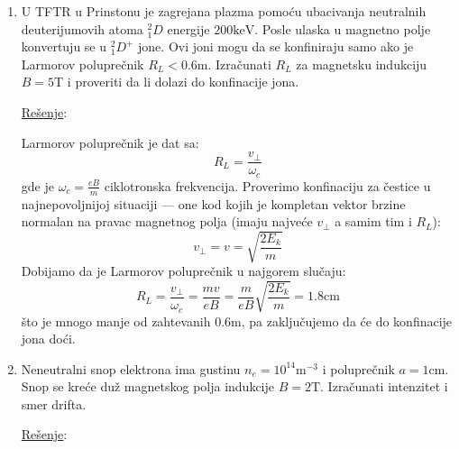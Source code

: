 \documentclass[fleqn]{report}
\begin{document}
\begin{enumerate}
          \hrulefill
    \item U TFTR u Prinstonu je zagrejana plazma pomoću ubacivanja neutralnih deuterijumovih atoma $^2_1D$ energije $200\si{\kilo\electronvolt}$.
          Posle ulaska u magnetno polje konvertuju se u $^2_1D^+$ jone.
          Ovi joni mogu da se konfiniraju samo ako je Larmorov poluprečnik $R_L < 0.6\si{\meter}$.
          Izračunati $R_L$ za magnetsku indukciju $B=5\si{\tesla}$ i proveriti da li dolazi do konfinacije jona.

          \underline{Rešenje}:

          Larmorov poluprečnik je dat sa:
          \[ R_L = \frac{v_\perp}{\omega_c} \]
          gde je $\omega_c = \frac{eB}{m}$ ciklotronska frekvencija.
          Proverimo konfinaciju za čestice u najnepovoljnijoj situaciji --- one kod kojih je kompletan vektor brzine normalan na pravac magnetnog polja (imaju najveće $v_\perp$ a samim tim i $R_L$):
          \[ v_\perp = v = \sqrt{\frac{2E_k}{m}} \]
          Dobijamo da je Larmorov poluprečnik u najgorem slučaju:
          \[ R_L = \frac{v_\perp}{\omega_c} = \frac{mv}{eB} = \frac{m}{eB}\sqrt{\frac{2E_k}{m}} = 1.8\si{\centi\meter} \]
          što je mnogo manje od zahtevanih $0.6\si{\meter}$, pa zaključujemo da će do konfinacije jona doći.

          \hrulefill
    \item Neneutralni snop elektrona ima gustinu $n_e = 10^{14}\si{\meter^{-3}}$ i poluprečnik $a = 1\si{\centi\meter}$.
          Snop se kreće duž magnetskog polja indukcije $B = 2\si{\tesla}$.
          Izračunati intenzitet i smer drifta.

          \underline{Rešenje}:

          \noindent\hfill
          \hfill\null\\


\end{enumerate}
\end{document}
